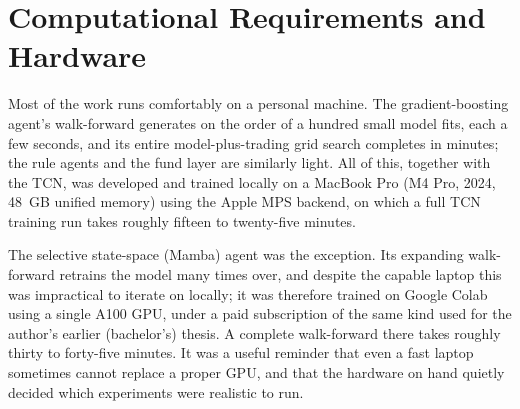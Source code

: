 \section{Computational Requirements and Hardware}
\label{sec:compute}

Most of the work runs comfortably on a personal machine. The gradient-boosting agent's walk-forward generates on the order of a hundred small model fits, each a few seconds, and its entire model-plus-trading grid search completes in minutes; the rule agents and the fund layer are similarly light. All of this, together with the TCN, was developed and trained locally on a MacBook Pro (M4 Pro, 2024, 48~GB unified memory) using the Apple MPS backend, on which a full TCN training run takes roughly fifteen to twenty-five minutes.


The selective state-space (Mamba) agent was the exception. Its expanding walk-forward retrains the model many times over, and despite the capable laptop this was impractical to iterate on locally; it was therefore trained on Google Colab using a single A100 GPU, under a paid subscription of the same kind used for the author's earlier (bachelor's) thesis. A complete walk-forward there takes roughly thirty to forty-five minutes. It was a useful reminder that even a fast laptop sometimes cannot replace a proper GPU, and that the hardware on hand quietly decided which experiments were realistic to run.
